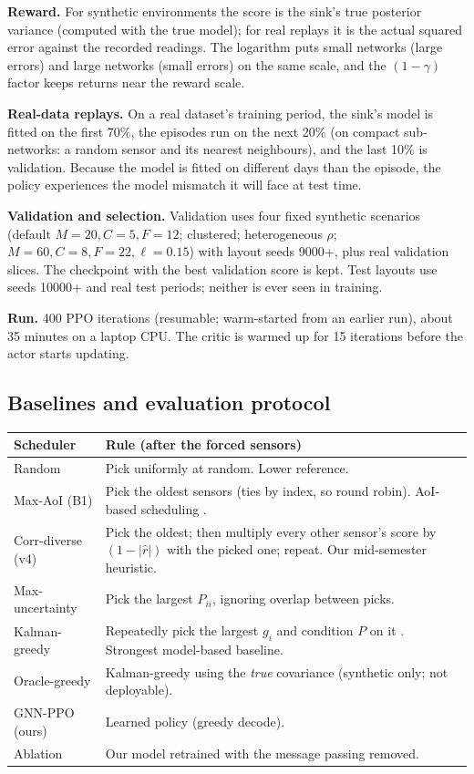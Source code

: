 \textbf{Reward.} For synthetic environments the score is the sink's true posterior variance (computed with the true
model); for real replays it is the actual squared error against the recorded readings. The logarithm puts small
networks (large errors) and large networks (small errors) on the same scale, and the $(1-\gamma)$ factor keeps
returns near the reward scale.

\textbf{Real-data replays.} On a real dataset's training period, the sink's model is fitted on the first 70\%, the
episodes run on the next 20\% (on compact sub-networks: a random sensor and its nearest neighbours), and the last
10\% is validation. Because the model is fitted on different days than the episode, the policy experiences the
model mismatch it will face at test time.

\textbf{Validation and selection.} Validation uses four fixed synthetic scenarios (default $M=20,C=5,F=12$;
clustered; heterogeneous $\rho$; $M=60,C=8,F=22,\ell=0.15$) with layout seeds 9000+, plus real validation slices.
The checkpoint with the best validation score is kept. Test layouts use seeds 10000+ and real test periods; neither
is ever seen in training.

\textbf{Run.} 400 PPO iterations (resumable; warm-started from an earlier run), about 35 minutes on a laptop CPU.
The critic is warmed up for 15 iterations before the actor starts updating.

\subsection{Baselines and evaluation protocol}

\begin{center}
\small
\begin{tabularx}{\textwidth}{@{}lX@{}}
\toprule
\textbf{Scheduler} & \textbf{Rule (after the forced sensors)} \\
\midrule
Random & Pick uniformly at random. Lower reference. \\
Max-AoI (B1) & Pick the oldest sensors (ties by index, so round robin). AoI-based scheduling \cite{2,16}. \\
Corr-diverse (v4) & Pick the oldest; then multiply every other sensor's score by $(1-|\hat r|)$ with the picked one; repeat. Our mid-semester heuristic. \\
Max-uncertainty & Pick the largest $P_{ii}$, ignoring overlap between picks. \\
Kalman-greedy & Repeatedly pick the largest $g_i$ and condition $P$ on it \cite{19}. Strongest model-based baseline. \\
Oracle-greedy & Kalman-greedy using the \emph{true} covariance (synthetic only; not deployable). \\
GNN-PPO (ours) & Learned policy (greedy decode). \\
Ablation & Our model retrained with the message passing removed. \\
\bottomrule
\end{tabularx}
\end{center}

